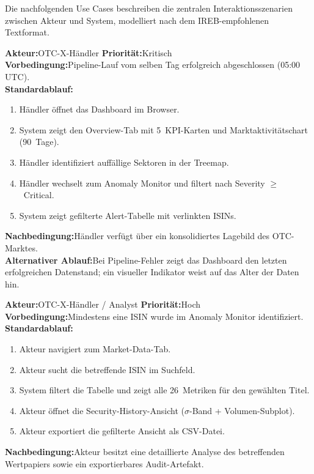 \documentclass[11pt, a4paper, oneside, openany]{report}
\begin{document}
Die nachfolgenden Use Cases beschreiben die zentralen Interaktionsszenarien zwischen Akteur und System, modelliert nach dem IREB-empfohlenen Textformat.

\begin{reqbox}
\textbf{Akteur:}\;OTC-X-Händler \qquad \textbf{Priorität:}\;Kritisch \\[4pt]
\textbf{Vorbedingung:}\;Pipeline-Lauf vom selben Tag erfolgreich abgeschlossen (05:00\,UTC). \\[4pt]
\textbf{Standardablauf:}
\begin{enumerate}[leftmargin=2em]
  \item Händler öffnet das Dashboard im Browser.
  \item System zeigt den Overview-Tab mit 5~KPI-Karten und Marktaktivitätschart (90~Tage).
  \item Händler identifiziert auffällige Sektoren in der Treemap.
  \item Händler wechselt zum Anomaly Monitor und filtert nach Severity $\geq$~Critical.
  \item System zeigt gefilterte Alert-Tabelle mit verlinkten ISINs.
\end{enumerate}
\textbf{Nachbedingung:}\;Händler verfügt über ein konsolidiertes Lagebild des OTC-Marktes. \\[4pt]
\textbf{Alternativer Ablauf:}\;Bei Pipeline-Fehler zeigt das Dashboard den letzten erfolgreichen Datenstand; ein visueller Indikator weist auf das Alter der Daten hin.
\end{reqbox}

\vspace{8pt}

\begin{reqbox}
\textbf{Akteur:}\;OTC-X-Händler / Analyst \qquad \textbf{Priorität:}\;Hoch \\[4pt]
\textbf{Vorbedingung:}\;Mindestens eine ISIN wurde im Anomaly Monitor identifiziert. \\[4pt]
\textbf{Standardablauf:}
\begin{enumerate}[leftmargin=2em]
  \item Akteur navigiert zum Market-Data-Tab.
  \item Akteur sucht die betreffende ISIN im Suchfeld.
  \item System filtert die Tabelle und zeigt alle 26~Metriken für den gewählten Titel.
  \item Akteur öffnet die Security-History-Ansicht ($\sigma$-Band + Volumen-Subplot).
  \item Akteur exportiert die gefilterte Ansicht als CSV-Datei.
\end{enumerate}
\textbf{Nachbedingung:}\;Akteur besitzt eine detaillierte Analyse des betreffenden Wertpapiers sowie ein exportierbares Audit-Artefakt.
\end{reqbox}
\end{document}
